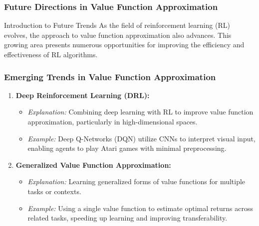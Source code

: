 \documentclass[aspectratio=169]{beamer}
\begin{document}
\begin{frame}[fragile]
  \frametitle{Future Directions in Value Function Approximation}
  \begin{block}{Introduction to Future Trends}
    As the field of reinforcement learning (RL) evolves, the approach to value function approximation also advances. This growing area presents numerous opportunities for improving the efficiency and effectiveness of RL algorithms.
  \end{block}
\end{frame}

\begin{frame}[fragile]
  \frametitle{Emerging Trends in Value Function Approximation}
  \begin{enumerate}
    \item \textbf{Deep Reinforcement Learning (DRL):}
      \begin{itemize}
        \item \textit{Explanation:} Combining deep learning with RL to improve value function approximation, particularly in high-dimensional spaces.
        \item \textit{Example:} Deep Q-Networks (DQN) utilize CNNs to interpret visual input, enabling agents to play Atari games with minimal preprocessing.
      \end{itemize}
    
    \item \textbf{Generalized Value Function Approximation:}
      \begin{itemize}
        \item \textit{Explanation:} Learning generalized forms of value functions for multiple tasks or contexts.
        \item \textit{Example:} Using a single value function to estimate optimal returns across related tasks, speeding up learning and improving transferability.
      \end{itemize}
  \end{enumerate}
\end{frame}
\end{document}
